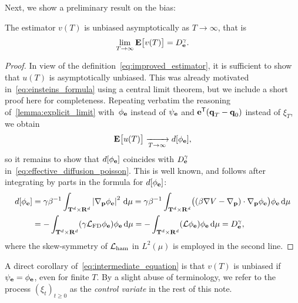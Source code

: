 \documentclass[11pt,a4paper]{article}
\begin{document}
Next, we show a preliminary result on the bias:
\begin{lemma}
    \label{lemma:asymptotic_bias}
    The estimator $v(T)$ is unbiased asymptotically as $T \to \infty$,
    that is
    \begin{equation}
        \label{eq:estimator_is_unbiased}
        \lim_{T \to \infty} \mathbf{E} \bigl[v(T)\bigr]
        = D^{\gamma}_{\boldsymbol{\mathbf e}}.
    \end{equation}
\end{lemma}
\begin{proof}
    In view of the definition~\eqref{eq:improved_estimator},
    it is sufficient to show that $u(T)$ is asymptotically unbiased.
    This was already motivated in~\eqref{eq:einsteins_formula} using a central limit theorem,
    but we include a short proof here for completeness.
    Repeating verbatim the reasoning of~\cref{lemma:explicit_limit} with~$\phi_{\boldsymbol{\mathbf e}}$ instead of $\psi_{\boldsymbol{\mathbf e}}$ and $\boldsymbol{\mathbf e}^\mathsf T (\boldsymbol{\mathbf q}_T - \boldsymbol{\mathbf q}_0)$ instead of $\xi_T$,
    we obtain
    \begin{equation}
        \label{eq:intermediate_equation}
        \mathbf{E} \bigl[u(T)\bigr]
        \xrightarrow[T \to \infty]{} d[\phi_{\boldsymbol{\mathbf e}}],
    \end{equation}
    so it remains to show that $d[\phi_{\boldsymbol{\mathbf e}}]$ coincides with $D^{\gamma}_{\boldsymbol{\mathbf e}}$ in~\eqref{eq:effective_diffusion_poisson}.
    This is well known,
    and follows after integrating by parts in the formula for $d[\phi_{\boldsymbol{\mathbf e}}]$:
    \begin{align*}
        d[\phi_{\vect e}]
        &= \gamma \beta^{-1} \int_{\torus^d \times \real^d} \abs{\grad_{\vect p} \phi_{\vect e}}^2 \, \d \mu
        = \gamma \beta^{-1} \int_{\torus^d \times \real^d} \bigl((\beta \grad V - \grad_{\vect p}) \cdot \grad_{\vect p}\phi_{\vect e} \bigr) \phi_{\vect e} \, \d \mu  \\
        &= -\int_{\torus^d \times \real^d} (\gamma \mathcal L_{\rm FD} \phi_{\vect e}) \phi_{\vect e} \, \d \mu
        = -\int_{\torus^d \times \real^d} (\mathcal L \phi_{\vect e}) \phi_{\vect e} \, \d \mu
        = D^{\gamma}_{\vect e},
    \end{align*}
    where the skew-symmetry of $\mathcal L_{\rm ham}$ in $L^2(\mu)$ is employed in the second line.
\end{proof}
A direct corollary of~\eqref{eq:intermediate_equation} is that $v(T)$ is unbiased if $\psi_{\boldsymbol{\mathbf e}} = \phi_{\boldsymbol{\mathbf e}}$, even for finite $T$.
By a slight abuse of terminology,
we refer to the process $(\xi_t)_{t \geq 0}$ as the \emph{control variate} in the rest of this note.
\end{document}
